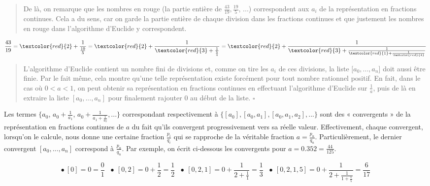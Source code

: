 \begin{quote}
    De là, on remarque que les nombres en rouge (la partie entière de $\frac{43}{19}, \frac{19}{5}$, ...) correspondent aux $a_i$ de la représentation en fractions continues. Cela a du sens, car on garde la partie entière de chaque division dans les fractions continues et que justement les nombres en rouge dans l'algorithme d'Euclide y correspondent.
\end{quote}

\begin{equation*}
    \frac{43}{19} = \textcolor{red}{2} + \frac{1}{\frac{19}{5}} = \textcolor{red}{2} + \frac{1}{\textcolor{red}{3} + \frac{1}{\frac{5}{4}}} = \textcolor{red}{2} + \frac{1}{\textcolor{red}{3} + \frac{1}{\textcolor{red}{1} + \frac{1}{\textcolor{red}{4}}}}
\end{equation*}

\begin{quote}
    L'algorithme d'Euclide contient un nombre fini de divisions et, comme on tire les $a_i$ de ces divisions, la liste $[a_0, ..., a_n$] doit aussi être finie. Par le fait même, cela montre qu'une telle représentation existe forcément pour tout nombre rationnel positif. En fait, dans le cas où $0 < a < 1$, on peut obtenir sa représentation en fractions continues en effectuant l'algorithme d'Euclide sur $\frac{1}{a}$, puis de là en extraire la liste $[a_0, ..., a_n]$ pour finalement rajouter 0 au début de la liste. $\square$
\end{quote}

Les termes $\{a_0$, $a_0 + \frac{1}{a_1}$, $a_0 + \frac{1}{a_1 + \frac{1}{a_2}}, ...\}$ correspondant respectivement à $\{[a_0], [a_0, a_1], [a_0, a_1, a_2], ...\}$ sont des « convergents » de la représentation en fractions continues de $a$ du fait qu'ils convergent progressivement vers sa réelle valeur. Effectivement, chaque convergent, lorsqu'on le calcule, nous donne une certaine fraction $\frac{p_i}{q_i}$ qui se rapproche de la véritable fraction $a = \frac{p_n}{q_n}$. Particulièrement, le dernier convergent $[a_0, ..., a_n]$ correspond à $\frac{p_n}{q_n}$. Par exemple, on écrit ci-dessous les convergents pour $a = 0.352 = \frac{44}{125}$.

\begin{equation*}
    \bullet \ [0] = 0 = \frac{0}{1}\ \ \ \bullet \ [0,2] = 0 + \frac{1}{2} = \frac{1}{2}\ \ \ \bullet \ [0,2,1] = 0 + \frac{1}{2 + \frac{1}{1}} = \frac{1}{3}\ \ \ \bullet \ [0,2,1,5] = 0 + \frac{1}{2 + \frac{1}{1 + \frac{1}{5}}} = \frac{6}{17}
\end{equation*}

